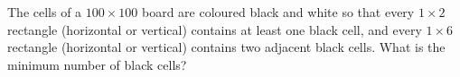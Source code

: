 The cells of a $100\times100$ board are coloured black and white so that every $1\times2$ rectangle (horizontal or vertical) contains at least one black cell, and every $1\times6$ rectangle (horizontal or vertical) contains two adjacent black cells. What is the minimum number of black cells?
